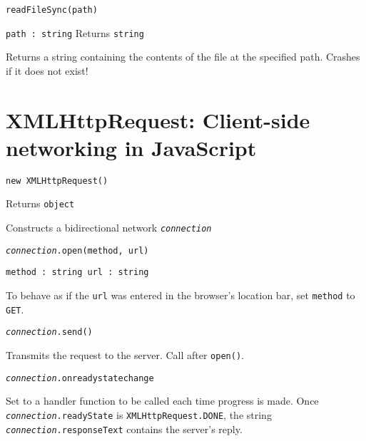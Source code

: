 \documentclass[12pt,letterpaper]{article}
\newcommand{\texttit}[1]{\texttt{\textit{#1}}}
\newenvironment{itemize*}%
	{\begin{itemize}%
		\setlength{\itemsep}{0pt}%
		\setlength{\parskip}{0pt}%
		\footnotesize%
	}%
	{\end{itemize}}
\begin{document}
\texttt{readFileSync(path)}
\begin{itemize*}
\item[] \texttt{path :\ string} \qquad Returns \texttt{string}
\item[] Returns a string containing the contents of the file at the specified path.
	Crashes if it does not exist!
\end{itemize*}

\section*{XMLHttpRequest: Client-side networking in JavaScript}

\texttt{new XMLHttpRequest()}
\begin{itemize*}
\item[] Returns \texttt{object}
\item[] Constructs a bidirectional network \texttit{connection}
\end{itemize*}

\texttt{\textit{connection}.open(method, url)}
\begin{itemize*}
\item[] \texttt{method :\ string \quad url :\ string}
\item[] To behave as if the \texttt{url} was entered in the browser's location bar, set \texttt{method} to \texttt{\textquotesingle GET\textquotesingle}.
\end{itemize*}

\texttt{\textit{connection}.send()}
\begin{itemize*}
\item[] Transmits the request to the server.
	Call after \texttt{open()}.
\end{itemize*}

\texttt{\textit{connection}.onreadystatechange}
\begin{itemize*}
\item[] Set to a handler function to be called each time progress is made.
	Once \texttt{\textit{connection}.readyState} is \texttt{XMLHttpRequest.DONE}, the string \texttt{\textit{connection}.responseText} contains the server's reply.
\end{itemize*}
\end{document}
